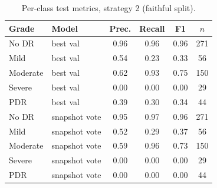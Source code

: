 \begin{table}[t]
\centering
\caption{Per-class test metrics, strategy 2 (faithful split).}
\label{tab:perclass}
\footnotesize
\begin{tabular}{llcccc}
\toprule
Grade & Model & Prec. & Recall & F1 & $n$ \\
\midrule
No DR & best val & 0.96 & 0.96 & 0.96 & 271 \\
Mild & best val & 0.54 & 0.23 & 0.33 & 56 \\
Moderate & best val & 0.62 & 0.93 & 0.75 & 150 \\
Severe & best val & 0.00 & 0.00 & 0.00 & 29 \\
PDR & best val & 0.39 & 0.30 & 0.34 & 44 \\
\midrule
No DR & snapshot vote & 0.95 & 0.97 & 0.96 & 271 \\
Mild & snapshot vote & 0.52 & 0.29 & 0.37 & 56 \\
Moderate & snapshot vote & 0.59 & 0.96 & 0.73 & 150 \\
Severe & snapshot vote & 0.00 & 0.00 & 0.00 & 29 \\
PDR & snapshot vote & 0.00 & 0.00 & 0.00 & 44 \\
\bottomrule
\end{tabular}
\end{table}

